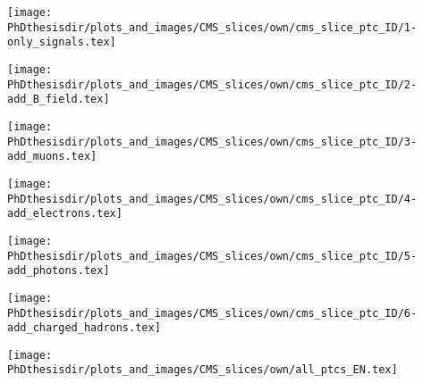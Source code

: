 \begin{frame}
\addtocounter{framenumber}{-1}
\transwipe[duration=3]
\begin{center}
\texttt{[image: \\PhDthesisdir/plots\_and\_images/CMS\_slices/own/cms\_slice\_ptc\_ID/1-only\_signals.tex]}
\end{center}
\end{frame}

\begin{frame}
\addtocounter{framenumber}{-1}
\transdissolve
\begin{center}
\texttt{[image: \\PhDthesisdir/plots\_and\_images/CMS\_slices/own/cms\_slice\_ptc\_ID/2-add\_B\_field.tex]}
\end{center}
\end{frame}

\begin{frame}
\addtocounter{framenumber}{-1}
\transdissolve
\begin{center}
\texttt{[image: \\PhDthesisdir/plots\_and\_images/CMS\_slices/own/cms\_slice\_ptc\_ID/3-add\_muons.tex]}
\end{center}
\end{frame}

\begin{frame}
\addtocounter{framenumber}{-1}
\transdissolve
\begin{center}
\texttt{[image: \\PhDthesisdir/plots\_and\_images/CMS\_slices/own/cms\_slice\_ptc\_ID/4-add\_electrons.tex]}
\end{center}
\end{frame}

\begin{frame}
\addtocounter{framenumber}{-1}
\transdissolve
\begin{center}
\texttt{[image: \\PhDthesisdir/plots\_and\_images/CMS\_slices/own/cms\_slice\_ptc\_ID/5-add\_photons.tex]}
\end{center}
\end{frame}

\begin{frame}
\addtocounter{framenumber}{-1}
\transdissolve
\begin{center}
\texttt{[image: \\PhDthesisdir/plots\_and\_images/CMS\_slices/own/cms\_slice\_ptc\_ID/6-add\_charged\_hadrons.tex]}
\end{center}
\end{frame}

\begin{frame}
\addtocounter{framenumber}{-1}
\transdissolve
\begin{center}
\texttt{[image: \\PhDthesisdir/plots\_and\_images/CMS\_slices/own/all\_ptcs\_EN.tex]}
\end{center}
\end{frame}